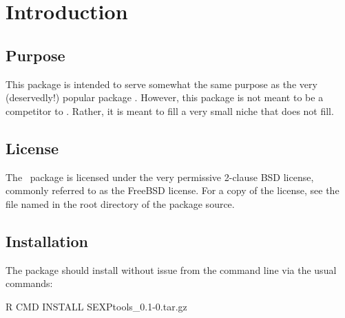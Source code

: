 \section{Introduction}


\subsection{Purpose}
This package is intended to serve somewhat the same purpose as the very 
(deservedly!) popular package .  However, this package is not meant
to be a competitor to .  Rather, it is meant to fill a very small niche
that  does not fill.


\subsection{License}

The \thispackage\ package is licensed under the very permissive 2-clause BSD 
license, commonly referred to as the FreeBSD license.  For a copy of the license,
see the file named  in the root directory of the package source.


\subsection{Installation}

The package should install without issue from the command line via the usual 
commands:
\begin{Command}
R CMD INSTALL SEXPtools_0.1-0.tar.gz
\end{Command}
